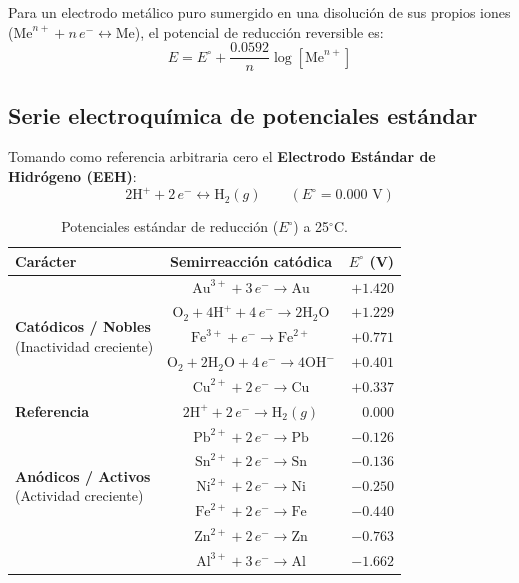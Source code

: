 Para un electrodo metálico puro sumergido en una disolución de sus propios iones ($\text{Me}^{n+} + n\,e^- \longleftrightarrow \text{Me}$), el potencial de reducción reversible es:
\begin{equation}
    E = E^\circ + \frac{0.0592}{n} \log [\text{Me}^{n+}]
    \label{eq:nernst_metal}
\end{equation}

\subsection{Serie electroquímica de potenciales estándar}
Tomando como referencia arbitraria cero el \textbf{Electrodo Estándar de Hidrógeno (EEH)}:
\begin{equation}
    2\text{H}^+ + 2\,e^- \longleftrightarrow \text{H}_2(g) \qquad (E^\circ = 0.000\text{ V})
\end{equation}

\begin{table}[H]
    \centering
    \caption{Potenciales estándar de reducción ($E^\circ$) a 25$^\circ$C.}
    \begin{tabular}{lcr}
        \toprule
        \textbf{Carácter} & \textbf{Semirreacción catódica} & \textbf{$E^\circ$ (V)} \\
        \midrule
        \multirow{5}{*}{\parbox{3cm}{\centering \textbf{Catódicos / Nobles}\\(Inactividad creciente)}} 
        & $\text{Au}^{3+} + 3\,e^- \longrightarrow \text{Au}$ & $+1.420$ \\
        & $\text{O}_2 + 4\text{H}^+ + 4\,e^- \longrightarrow 2\text{H}_2\text{O}$ & $+1.229$ \\
        & $\text{Fe}^{3+} + e^- \longrightarrow \text{Fe}^{2+}$ & $+0.771$ \\
        & $\text{O}_2 + 2\text{H}_2\text{O} + 4\,e^- \longrightarrow 4\text{OH}^-$ & $+0.401$ \\
        & $\text{Cu}^{2+} + 2\,e^- \longrightarrow \text{Cu}$ & $+0.337$ \\
        \midrule
        \textbf{Referencia} & $2\text{H}^+ + 2\,e^- \longrightarrow \text{H}_2(g)$ & $0.000$ \\
        \midrule
        \multirow{5}{*}{\parbox{3cm}{\centering \textbf{Anódicos / Activos}\\(Actividad creciente)}} 
        & $\text{Pb}^{2+} + 2\,e^- \longrightarrow \text{Pb}$ & $-0.126$ \\
        & $\text{Sn}^{2+} + 2\,e^- \longrightarrow \text{Sn}$ & $-0.136$ \\
        & $\text{Ni}^{2+} + 2\,e^- \longrightarrow \text{Ni}$ & $-0.250$ \\
        & $\text{Fe}^{2+} + 2\,e^- \longrightarrow \text{Fe}$ & $-0.440$ \\
        & $\text{Zn}^{2+} + 2\,e^- \longrightarrow \text{Zn}$ & $-0.763$ \\
        & $\text{Al}^{3+} + 3\,e^- \longrightarrow \text{Al}$ & $-1.662$ \\
        \bottomrule
    \end{tabular}
    \label{tab:potenciales_estandar}
\end{table}

